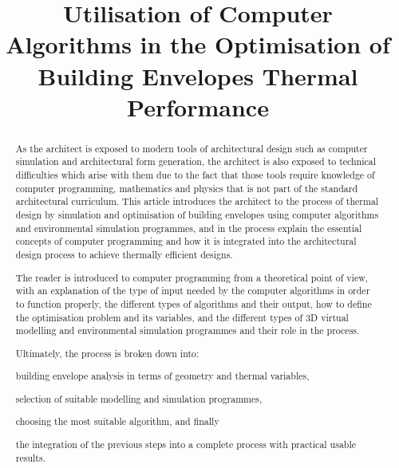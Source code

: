 \documentclass[11pt,a4paper,oneside]{article}
\title{\vspace{-15mm}%
	\Large \textbf{Utilisation of Computer Algorithms in the Optimisation of Building Envelopes Thermal Performance}}
\date{}
\begin{document}
\maketitle
\vspace{-1.5cm}
\begin{abstract}
\noindent As the architect is exposed to modern tools of architectural design such as computer simulation and architectural form generation, the architect is also exposed to technical difficulties which arise with them due to the fact that those tools require knowledge of computer programming, mathematics and physics that is not part of the standard architectural curriculum. This article introduces the architect to the process of thermal design by simulation and optimisation of building envelopes using computer algorithms and environmental simulation programmes, and in the process explain the essential concepts of computer programming and how it is integrated into the architectural design process to achieve thermally efficient designs.

\noindent The reader is introduced to computer programming from a theoretical point of view, with an explanation of the type of input needed by the computer algorithms in order to function properly, the different types of algorithms and their output, how to define the optimisation problem and its variables, and the different types of 3D virtual modelling and environmental simulation programmes and their role in the process.

\noindent Ultimately, the process is broken down into: \begin{inparaenum} \item building envelope analysis in terms of geometry and thermal variables, \item selection of suitable modelling and simulation programmes, \item choosing the most suitable algorithm, and finally \item the integration of the previous steps into a complete process with practical usable results.\end{inparaenum}
\end{abstract}
\end{document}
